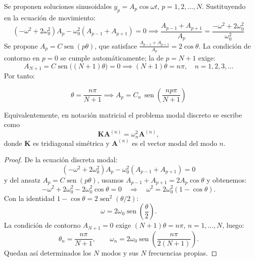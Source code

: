 \documentclass[12pt, a4paper]{article}
\theoremstyle{plain}
\theoremstyle{definition}
\theoremstyle{remark}
\DeclareMathOperator{\sen}{sen}
\begin{document}
Se proponen soluciones sinusoidales $y_p = A_p\cos\omega t$, $p = 1,2,\ldots,N$.
Sustituyendo en la ecuación de movimiento:
\begin{equation}
  (-\omega^2+2\omega_0^2)A_p - \omega_0^2(A_{p-1}+A_{p+1}) = 0
  \implies
  \frac{A_{p-1}+A_{p+1}}{A_p} = \frac{-\omega^2+2\omega_0^2}{\omega_0^2}
\end{equation}
Se propone $A_p = C\sen(p\theta)$, que satisface
$\frac{A_{p-1}+A_{p+1}}{A_p} = 2\cos\theta$.
La condición de contorno en $p=0$ se cumple automáticamente; la de $p=N+1$ exige:
\begin{equation}
  A_{N+1} = C\sen\!\bigl((N+1)\theta\bigr) = 0
  \implies (N+1)\theta = n\pi,\quad n = 1,2,3,\ldots
\end{equation}
Por tanto:
\begin{mdframed}[style=resultado]
\begin{equation}
  \theta = \frac{n\pi}{N+1}
  \implies
  A_p = C_n\,\sen\!\left(\frac{np\pi}{N+1}\right)
\end{equation}
\end{mdframed}

Equivalentemente, en notación matricial el problema modal discreto se escribe como
\[
  \mathbf{K}\mathbf{A}^{(n)}=\omega_n^2\mathbf{A}^{(n)},
\]
donde $\mathbf{K}$ es tridiagonal simétrica y $\mathbf{A}^{(n)}$ es el vector modal del
modo $n$.

\begin{proof}
De la ecuación discreta modal:
\begin{equation}
  (-\omega^2+2\omega_0^2)A_p-\omega_0^2(A_{p-1}+A_{p+1})=0
\end{equation}
y del ansatz $A_p=C\sen(p\theta)$, usamos
$A_{p-1}+A_{p+1}=2A_p\cos\theta$ y obtenemos:
\begin{equation}
  -\omega^2+2\omega_0^2-2\omega_0^2\cos\theta=0
  \quad\Rightarrow\quad
  \omega^2=2\omega_0^2(1-\cos\theta).
\end{equation}
Con la identidad $1-\cos\theta=2\sen^2(\theta/2)$:
\begin{equation}
  \omega=2\omega_0\sen\!\left(\frac{\theta}{2}\right).
\end{equation}
La condición de contorno $A_{N+1}=0$ exige
$(N+1)\theta=n\pi$, $n=1,\dots,N$, luego:
\begin{equation}
  \theta_n=\frac{n\pi}{N+1},
  \qquad
  \omega_n=2\omega_0\sen\!\left(\frac{n\pi}{2(N+1)}\right).
\end{equation}
Quedan así determinados los $N$ modos y sus $N$ frecuencias propias.
\end{proof}
\end{document}
